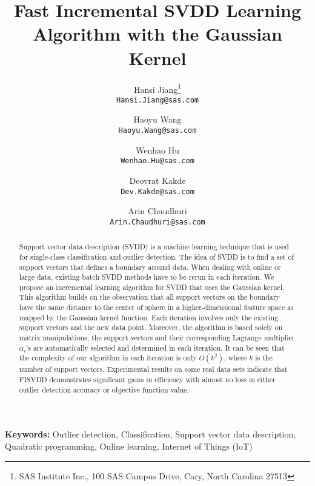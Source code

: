 \documentclass{article}
\numberwithin{equation}{section}
\begin{document}
\title{\Large Fast Incremental SVDD Learning Algorithm with the Gaussian Kernel}

\author{
Hansi Jiang\thanks{SAS Institute Inc., 100 SAS Campus Drive, Cary, North Carolina 27513} \\
\texttt{Hansi.Jiang@sas.com}
\and
Haoyu Wang\footnotemark[1] \\
\texttt{Haoyu.Wang@sas.com}
\and
Wenhao Hu\footnotemark[1] \\
\texttt{Wenhao.Hu@sas.com}
\and
Deovrat Kakde\footnotemark[1] \\
\texttt{Dev.Kakde@sas.com}
\and
Arin Chaudhuri\footnotemark[1] \\
\texttt{Arin.Chaudhuri@sas.com}
}
\date{}

\maketitle


\begin{abstract} %
Support vector data description (SVDD) is a machine learning technique that is used for single-class classification and outlier detection. The idea of SVDD is to find a set of support vectors that defines a boundary around data. When dealing with online or large data, existing batch SVDD methods have to be rerun in each iteration. We propose an incremental learning algorithm for SVDD that uses the Gaussian kernel. This algorithm builds on the observation that all support vectors on the boundary have the same distance to the center of sphere in a higher-dimensional feature space as mapped by the Gaussian kernel function. Each iteration involves only the existing support vectors and the new data point. Moreover, the algorithm is based solely on matrix manipulations; the support vectors and their corresponding Lagrange multiplier $\alpha_i$'s are automatically selected and determined in each iteration. It can be seen that the complexity of our algorithm in each iteration is only $O(k^2)$, where $k$ is the number of support vectors. Experimental results on some real data sets indicate that FISVDD demonstrates significant gains in efficiency with almost no loss in either outlier detection accuracy or objective function value.
\end{abstract}
{\bfseries Keywords:}
Outlier detection, Classification, Support vector data description, Quadratic programming, Online learning, Internet of Things (IoT)
\end{document}
